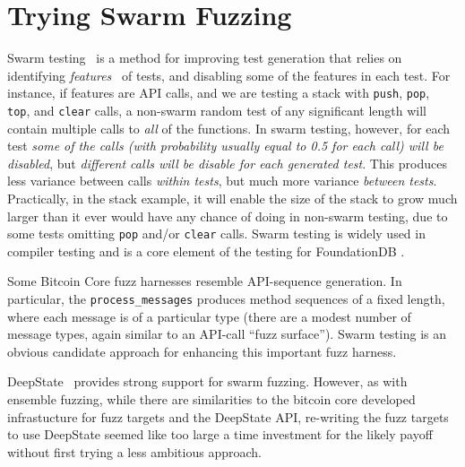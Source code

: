 \section{Trying Swarm Fuzzing}

Swarm testing~\cite{ISSTA12} is a method for improving test
generation that relies on identifying \emph{features}~\cite{groce2013help} of tests, and
disabling some of the features in each test.  For instance, if features are
API calls, and we are testing a stack with {\tt push}, {\tt pop}, {\tt
  top}, and {\tt clear} calls, a non-swarm random test of any
significant length will contain multiple calls to \emph{all} of
the functions.  In swarm testing, however, for each test \emph{some of the calls
(with probability usually equal to 0.5 for each call) will be
disabled}, but \emph{different calls will be disable for each generated
test}.  This produces less variance between calls \emph{within tests}, but
much more variance \emph{between tests}.  Practically, in the stack
example, it will enable the size of the stack to grow much larger than
it ever would have any chance of doing in non-swarm testing, due to
some tests omitting {\tt pop} and/or {\tt clear} calls.  Swarm testing
is widely used in compiler testing
\cite{le2014compiler} and is a core element of the
testing for FoundationDB \cite{zhou2021foundationdb}.

Some Bitcoin Core fuzz harnesses resemble API-sequence generation.  In particular, the {\tt process\_messages} produces method sequences of a fixed length, where each message is of a particular type (there are a modest number of message types, again similar to an API-call ``fuzz surface'').  Swarm testing is an obvious candidate approach for enhancing this important fuzz harness.

DeepState~\cite{goodman2018deepstate} provides strong support for swarm fuzzing.  However, as with ensemble fuzzing, while there are similarities to the bitcoin core developed infrastucture for fuzz targets and the DeepState API, re-writing the fuzz targets to use DeepState seemed like too large a time investment for the likely payoff without first trying a less ambitious approach.